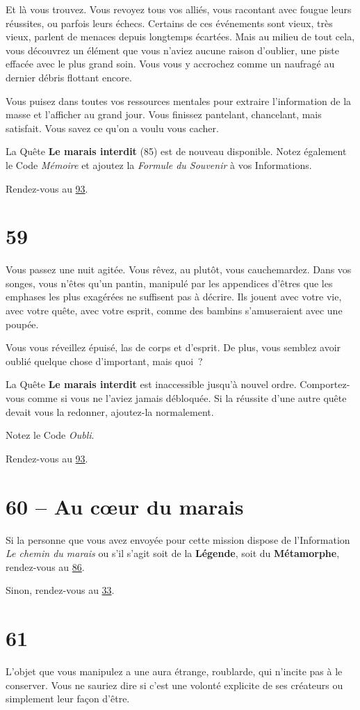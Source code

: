 \documentclass{report}
\newcommand{\gsection}[1]{
    \section{#1}
    \label{section-#1}
}
\newcommand{\glink}[1]{\hyperref[section-#1]{#1}}
\newcommand{\hero}[1]{\textbf{#1}}
\begin{document}
Et là vous trouvez. Vous revoyez tous vos alliés, vous racontant avec fougue leurs réussites, ou parfois leurs échecs. Certains de  ces événements sont vieux, très vieux, parlent de menaces depuis longtemps écartées. Mais au milieu de tout cela, vous découvrez un élément que vous n'aviez aucune raison d'oublier, une piste effacée avec le plus grand soin. Vous vous y accrochez comme un naufragé au dernier débris flottant encore.

Vous puisez dans toutes vos ressources mentales pour extraire l'information de la masse et l'afficher au grand jour. Vous finissez pantelant, chancelant, mais satisfait. Vous savez ce qu'on a voulu vous cacher.

La Quête \textbf{Le marais interdit} (85) est de nouveau disponible. Notez également le Code \emph{Mémoire} et ajoutez la \emph{Formule du Souvenir} à vos Informations.

Rendez-vous au \glink{93}.

\gsection{59}

Vous passez une nuit agitée. Vous rêvez, au plutôt, vous cauchemardez. Dans vos songes, vous n'êtes qu'un pantin, manipulé par les appendices d'êtres que les emphases les plus exagérées ne suffisent pas à décrire. Ils jouent avec votre vie, avec votre quête, avec votre esprit, comme des bambins s'amuseraient avec une poupée.

Vous vous réveillez épuisé, las de corps et d'esprit. De plus, vous semblez avoir oublié quelque chose d'important, mais quoi ?

La Quête \textbf{Le marais interdit} est inaccessible jusqu'à nouvel ordre. Comportez-vous comme si vous ne l'aviez jamais débloquée. Si la réussite d'une autre quête devait vous la redonner, ajoutez-la normalement.

Notez le Code \emph{Oubli}.

Rendez-vous au \glink{93}.

\gsection{60 – Au cœur du marais}

Si la personne que vous avez envoyée pour cette mission dispose de l'Information \emph{Le chemin du marais} ou s'il s'agit soit de la \hero{Légende}, soit du \hero{Métamorphe}, rendez-vous au \glink{86}.

Sinon, rendez-vous au \glink{33}.

\gsection{61}

L'objet que vous manipulez a une aura étrange, roublarde, qui n'incite pas à le conserver. Vous ne sauriez dire si c'est une volonté explicite  de ses créateurs ou simplement leur façon d'être.
\end{document}

